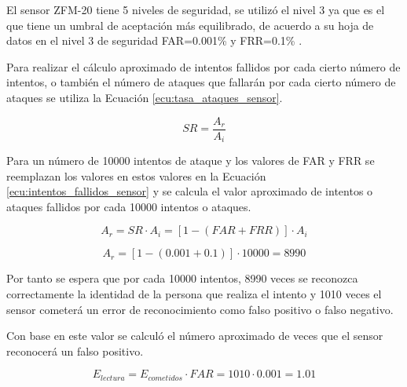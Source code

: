 \documentclass[../principal]{subfiles}
\begin{document}
  El sensor ZFM-20 tiene 5 niveles de seguridad, se utilizó el nivel 3 ya que es el que tiene un umbral de aceptación más equilibrado, de acuerdo a su hoja de datos en el nivel 3 de seguridad FAR=0.001\% y FRR=0.1\% \cite{manual:fingerprint_ZFM-20}.

  Para realizar el cálculo aproximado de intentos fallidos por cada cierto número de intentos, o también el número de ataques que fallarán por cada cierto número de ataques se utiliza la Ecuación \ref{ecu:tasa_ataques_sensor}.

  \vspace{-1.5em}
  \begin{equation}
    \label{ecu:tasa_ataques_sensor}
    SR = \frac{A_r}{A_i}
  \end{equation}
  \vspace{-2em}

Para un número de 10000 intentos de ataque y los valores de FAR y FRR se reemplazan los valores en estos valores en la Ecuación \ref{ecu:intentos_fallidos_sensor} y se calcula el valor aproximado de intentos o ataques fallidos por cada 10000 intentos o ataques.

  \vspace{-1.5em}
  \begin{equation}
    \label{ecu:intentos_fallidos_sensor}
    A_r = SR \cdot A_i = [1 - (FAR + FRR)] \cdot A_i
  \end{equation}
  \vspace{-2em}

  \vspace{-1.5em}
  \begin{equation}
    A_r = [1 - (0.001 + 0.1)] \cdot 10000 = 8990
  \end{equation}
  \vspace{-2em}

  Por tanto se espera que por cada 10000 intentos, 8990 veces se reconozca correctamente la identidad de la persona que realiza el intento y 1010 veces el sensor cometerá un error de reconocimiento como falso positivo o falso negativo.

  Con base en este valor se calculó el número aproximado de veces que el sensor reconocerá un falso positivo.

  \vspace{-1.5em}
  \begin{equation}
    \label{ecu:falso_positivo_calculo}
    E_{lectura} = E_{cometidos} \cdot FAR = 1010 \cdot 0.001 = 1.01
  \end{equation}
  \vspace{-2em}
\end{document}
